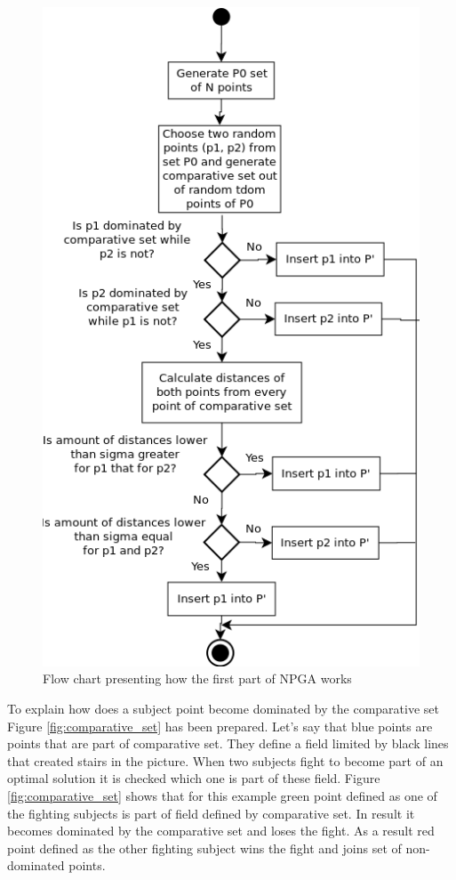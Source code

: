 \documentclass[a4paper, 11pt]{article}
\begin{document}
	\begin{figure}[H]
	\centering
	\includegraphics[scale=0.70]{NP_algorithm}
	\caption{Flow chart presenting how the first part of NPGA works}
	\label{fig:NP_algorithm}
	\end{figure}
	
	To explain how does a subject point become dominated by the comparative set
	Figure \ref{fig:comparative_set} has been prepared.
	Let's say that blue points are points that are part of comparative set.
	They define a field limited by black lines that created stairs in the picture.
	When two subjects fight to become part of an optimal solution it is checked
	which one is part of these field. Figure \ref{fig:comparative_set} shows that
	for this example green point defined as one of the fighting subjects is
	part of field defined by comparative set. In result it becomes dominated by
	the comparative set and loses the fight. As a result red point defined as the
	other fighting subject wins the fight and joins set of non-dominated points.
	
\end{document}
